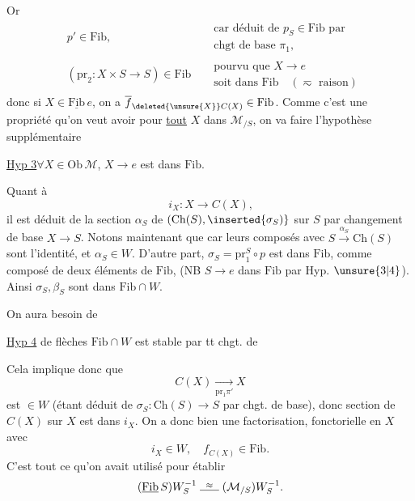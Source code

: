 Or
\[
\begin{aligned}
&p'\in\mathrm{Fib}, &&\substack{\text{car déduit de }p_S\in\mathrm{Fib}\text{ par}\\\text{chgt de base }\pi_1,}\\
&(\mathrm{pr}_2:X\times S\longrightarrow S)\in\mathrm{Fib} &&\substack{\text{pourvu que }X\longrightarrow e\\\text{soit dans }\mathrm{Fib}\quad(\eqsim\text{ raison})}
\end{aligned}
\]
donc si $X\in\underline{\mathrm{Fib}}\,e$, on a $\overline f_{\deleted{\unsure{X}}C(X)}\in\mathrm{Fib}$. Comme c'est une propriété  qu'on veut avoir pour \uline{tout} $X$ dans $\mathcal M_{/S}$, on va faire l'hypothèse supplémentaire

\uline{Hyp 3}\quad $\forall X\in\mathrm{Ob}\,\mathcal M$, $X\longrightarrow e$ est dans $\mathrm{Fib}$.

Quant à 
\[
i_X:X\longrightarrow C(X)\text{,}
\]
il est déduit de la section $\alpha_S$ de $(\mathrm{Ch}(S),\inserted{\sigma_S)}$ sur $S$ par changement de base $X\longrightarrow S$. Notons maintenant que 
car leurs composés avec $S\xrightarrow{\alpha_S}\mathrm{Ch}(S)$ sont l'identité, et $\alpha_S\in W$. D'autre part, $\sigma_S=\mathrm{pr}_1^S\circ p$ est dans $\mathrm{Fib}$, comme composé de deux éléments de $\mathrm{Fib}$, (NB $S\longrightarrow e$ dans $\mathrm{Fib}$ par Hyp. $\unsure{3|4}$). Ainsi $\sigma_S,\beta_S$ sont dans $\mathrm{Fib}\cap W$.

On aura besoin de

\uline{Hyp 4}\quad {}  de flèches $\mathrm{Fib}\cap W$ est stable par tt chgt. de 

Cela implique donc que
\[
C(X)\xrightarrow[\mathrm{pr}_1\pi']{}X
\]
est $\in W$ (étant déduit de $\sigma_S:\mathrm{Ch}(S)\longrightarrow S$ par chgt. de base), donc  section  de $C(X)$ sur $X$ est dans $i_X$. On a donc bien une factorisation, fonctorielle en $X$
avec
\[
i_X\in W,\quad f_{C(X)}\in\mathrm{Fib}\text{.}
\]
C'est tout ce qu'on avait utilisé pour établir
\[
(\underline{\mathrm{Fib}}\,S)W_S^{-1}\mathrel{\overset{\approx}{\rule{1.7em}{.4pt}}}(\mathcal M_{/S})W_S^{-1}\text{.}
\]

